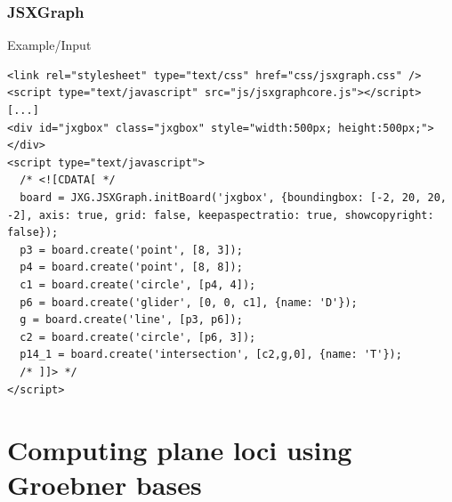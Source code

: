\documentclass{beamer}
\begin{document}
\begin{frame}[fragile]
  \frametitle{JSXGraph} 
  \begin{block}{Example/Input}
    \begin{lstlisting}
<link rel="stylesheet" type="text/css" href="css/jsxgraph.css" />
<script type="text/javascript" src="js/jsxgraphcore.js"></script>
[...]
<div id="jxgbox" class="jxgbox" style="width:500px; height:500px;"></div>
<script type="text/javascript">
  /* <![CDATA[ */
  board = JXG.JSXGraph.initBoard('jxgbox', {boundingbox: [-2, 20, 20, -2], axis: true, grid: false, keepaspectratio: true, showcopyright: false});
  p3 = board.create('point', [8, 3]);
  p4 = board.create('point', [8, 8]);
  c1 = board.create('circle', [p4, 4]);
  p6 = board.create('glider', [0, 0, c1], {name: 'D'});
  g = board.create('line', [p3, p6]);
  c2 = board.create('circle', [p6, 3]);
  p14_1 = board.create('intersection', [c2,g,0], {name: 'T'});
  /* ]]> */
</script>
    \end{lstlisting}
  \end{block}
\end{frame}




\section{Computing plane loci using Groebner bases}

\end{document}
